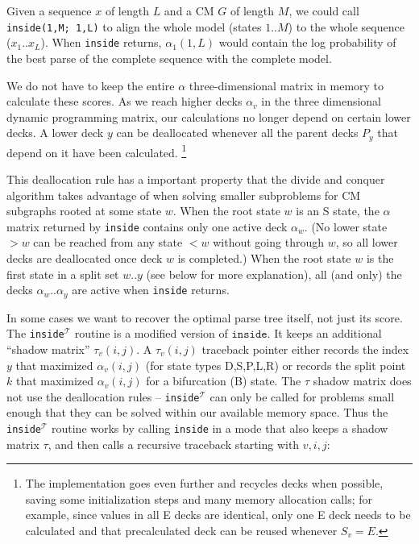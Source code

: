 \documentclass[11pt]{article}
\begin{document}
Given a sequence $x$ of length $L$ and a CM $G$ of length $M$, we
could call \texttt{inside(1,M; 1,L)} to align the whole model (states
$1..M$) to the whole sequence ($x_1..x_L$). When \texttt{inside}
returns, $\alpha_1(1,L)$ would contain the log probability of the best
parse of the complete sequence with the complete model. 

We do not have to keep the entire $\alpha$ three-dimensional matrix in
memory to calculate these scores.  As we reach higher decks $\alpha_v$
in the three dimensional dynamic programming matrix, our calculations
no longer depend on certain lower decks. A lower deck $y$ can be
deallocated whenever all the parent decks $P_y$ that depend on it
have been calculated. \footnote{The implementation goes even further
and recycles decks when possible, saving some initialization steps and
many memory allocation calls; for example, since values in all E decks
are identical, only one E deck needs to be calculated and that
precalculated deck can be reused whenever $S_v = E$.}

This deallocation rule has a important property that the divide and
conquer algorithm takes advantage of when solving smaller subproblems
for CM subgraphs rooted at some state $w$.  When the root state $w$ is
an S state, the $\alpha$ matrix returned by \texttt{inside} contains
only one active deck $\alpha_w$. (No lower state $>w$ can be reached
from any state $<w$ without going through $w$, so all lower decks are
deallocated once deck $w$ is completed.) When the root state $w$ is
the first state in a split set $w..y$ (see below for more
explanation), all (and only) the decks $\alpha_w..\alpha_y$ are active
when \texttt{inside} returns.

In some cases we want to recover the optimal parse tree itself, not
just its score. The \texttt{inside}$^{\mathcal{T}}$ routine is a
modified version of $\texttt{inside}$. It keeps an additional ``shadow
matrix'' $\tau_v(i,j)$. A $\tau_v(i,j)$ traceback pointer either
records the index $y$ that maximized $\alpha_v(i,j)$ (for state types
D,S,P,L,R) or records the split point $k$ that maximized
$\alpha_v(i,j)$ for a bifurcation (B) state. The $\tau$ shadow matrix
does not use the deallocation rules -- \texttt{inside}$^{\mathcal{T}}$
can only be called for problems small enough that they can be solved
within our available memory space. Thus the
\texttt{inside}$^{\mathcal{T}}$ routine works by calling
\texttt{inside} in a mode that also keeps a shadow matrix $\tau$,
and then calls a recursive traceback starting with $v,i,j$:
\end{document}
